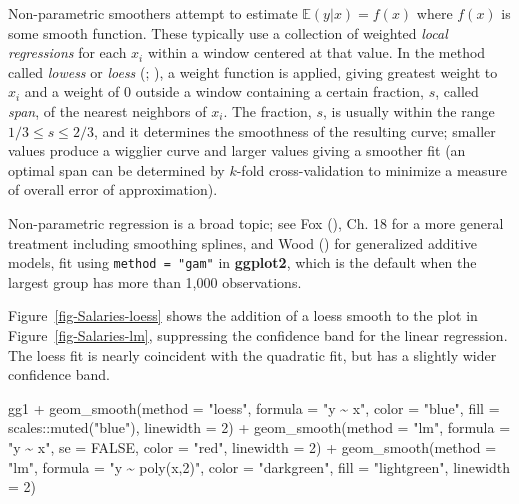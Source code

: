 \documentclass[
  letterpaper,
  10pt,
  krantz2]{krantz}
\makeatletter
\newenvironment{Shaded}{\begin{snugshade}}{\end{snugshade}}
\newcommand{\AttributeTok}[1]{\textcolor[rgb]{0.40,0.45,0.13}{#1}}
\newcommand{\ConstantTok}[1]{\textcolor[rgb]{0.56,0.35,0.01}{#1}}
\newcommand{\DecValTok}[1]{\textcolor[rgb]{0.68,0.00,0.00}{#1}}
\newcommand{\FunctionTok}[1]{\textcolor[rgb]{0.28,0.35,0.67}{#1}}
\newcommand{\NormalTok}[1]{\textcolor[rgb]{0.00,0.23,0.31}{#1}}
\newcommand{\SpecialCharTok}[1]{\textcolor[rgb]{0.37,0.37,0.37}{#1}}
\newcommand{\StringTok}[1]{\textcolor[rgb]{0.13,0.47,0.30}{#1}}
\newenvironment{kframe}{%
  \medskip{}
  \setlength{\fboxsep}{.8em}
  \def\at@end@of@kframe{}%
  \ifinner\ifhmode%
  \def\at@end@of@kframe{\end{minipage}}%
  \begin{minipage}{\columnwidth}%
  \fi\fi%
  \def\FrameCommand##1{\hskip\@totalleftmargin \hskip-\fboxsep
  \colorbox{shadecolor}{##1}\hskip-\fboxsep
      \hskip-\linewidth \hskip-\@totalleftmargin \hskip\columnwidth}%
  \MakeFramed {\advance\hsize-\width
    \@totalleftmargin\z@ \linewidth\hsize
    \@setminipage}}%
{\par\unskip\endMakeFramed%
  \at@end@of@kframe}
\renewenvironment{Shaded}{\begin{kframe}}{\end{kframe}}
\makeatother
\begin{document}
Non-parametric smoothers attempt to estimate
\(\mathbb{E} (y | x) = f(x)\) where \(f(x)\) is some smooth function.
These typically use a collection of weighted \emph{local regressions}
for each \(x_i\) within a window centered at that value. In the method
called \emph{lowess} or \emph{loess}
(;
), a weight
function is applied, giving greatest weight to \(x_i\) and a weight of 0
outside a window containing a certain fraction, \(s\), called
\emph{span}, of the nearest neighbors of \(x_i\). The fraction, \(s\),
is usually within the range \(1/3 \le s \le 2/3\), and it determines the
smoothness of the resulting curve; smaller values produce a wigglier
curve and larger values giving a smoother fit (an optimal span can be
determined by \(k\)-fold cross-validation to minimize a measure of
overall error of approximation).

Non-parametric regression is a broad topic; see Fox
(), Ch. 18 for a more general treatment
including smoothing splines, and Wood ()
for generalized additive models, fit using \texttt{method\ =\ "gam"} in
\textbf{ggplot2}, which is the default when the largest group has more
than 1,000 observations.

Figure~\ref{fig-Salaries-loess} shows the addition of a loess smooth to
the plot in Figure~\ref{fig-Salaries-lm}, suppressing the confidence
band for the linear regression. The loess fit is nearly coincident with
the quadratic fit, but has a slightly wider confidence band.

\begin{Shaded}
\begin{Highlighting}[]
\NormalTok{gg1 }\SpecialCharTok{+} 
  \FunctionTok{geom\_smooth}\NormalTok{(}\AttributeTok{method =} \StringTok{"loess"}\NormalTok{, }\AttributeTok{formula =} \StringTok{"y \textasciitilde{} x"}\NormalTok{, }
              \AttributeTok{color =} \StringTok{"blue"}\NormalTok{, }\AttributeTok{fill =}\NormalTok{ scales}\SpecialCharTok{::}\FunctionTok{muted}\NormalTok{(}\StringTok{"blue"}\NormalTok{),}
              \AttributeTok{linewidth =} \DecValTok{2}\NormalTok{) }\SpecialCharTok{+}
  \FunctionTok{geom\_smooth}\NormalTok{(}\AttributeTok{method =} \StringTok{"lm"}\NormalTok{, }\AttributeTok{formula =} \StringTok{"y \textasciitilde{} x"}\NormalTok{, }\AttributeTok{se =} \ConstantTok{FALSE}\NormalTok{,}
              \AttributeTok{color =} \StringTok{"red"}\NormalTok{,}
              \AttributeTok{linewidth =} \DecValTok{2}\NormalTok{) }\SpecialCharTok{+}
  \FunctionTok{geom\_smooth}\NormalTok{(}\AttributeTok{method =} \StringTok{"lm"}\NormalTok{, }\AttributeTok{formula =} \StringTok{"y \textasciitilde{} poly(x,2)"}\NormalTok{, }
              \AttributeTok{color =} \StringTok{"darkgreen"}\NormalTok{, }\AttributeTok{fill =} \StringTok{"lightgreen"}\NormalTok{,}
              \AttributeTok{linewidth =} \DecValTok{2}\NormalTok{) }
\end{Highlighting}
\end{Shaded}
\end{document}
